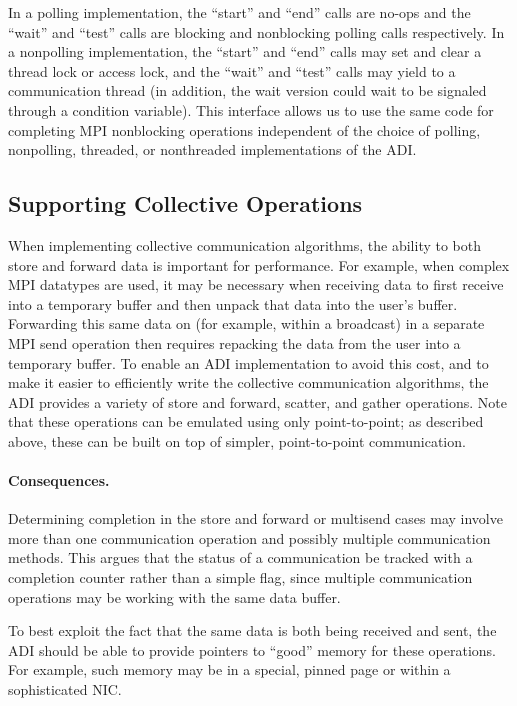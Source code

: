 \documentclass{article}
\begin{document}
In a polling implementation, the ``start'' and ``end'' calls are
no-ops and the ``wait'' and ``test'' calls are blocking and
nonblocking polling calls respectively.  In a nonpolling
implementation, the ``start'' and ``end'' calls may set and clear a thread lock
or access lock, and the ``wait'' and ``test'' calls may yield to a
communication thread (in addition, the wait version could wait to be
signaled through a condition variable).  This interface allows us to
use the same code for completing MPI nonblocking operations
independent of the choice of polling, nonpolling, threaded, or
nonthreaded implementations of the ADI.

\subsection{Supporting Collective Operations}
When implementing collective communication algorithms, the ability to
both store and forward data is important for performance.  For
example, when complex MPI datatypes are used, it may be necessary when
receiving data to first receive into a temporary buffer and then
unpack that data into the user's buffer.  Forwarding this same data on
(for example, within a broadcast) in a separate MPI send operation
then requires repacking the data from the user into a temporary
buffer.  To enable an ADI implementation to avoid this cost, and to
make it easier to efficiently write the collective communication
algorithms, the ADI provides a variety of store and forward, scatter,
and gather operations.  Note that these operations can be emulated
using only point-to-point; as described above, these can be built on
top of simpler, point-to-point communication.  


\paragraph{Consequences.}
Determining completion in the store and forward or multisend cases may involve
more than one communication 
operation and possibly multiple communication methods.  This argues
that the status of a communication be tracked with a completion
counter rather than a simple flag, since multiple communication
operations may be working with the same data buffer.  

To best exploit the fact that the same data is both being received and
sent, the ADI should be able to provide pointers to ``good'' memory
for these operations.  For example, such memory may be in a special,
pinned page or within a sophisticated NIC.  
\end{document}
